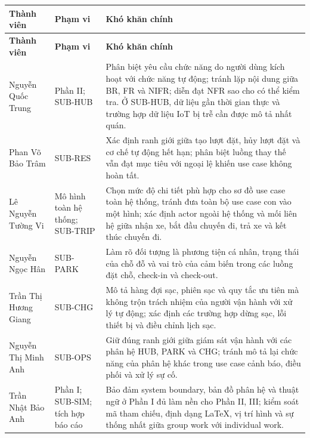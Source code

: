 \documentclass[10pt,a4paper]{article}
\begin{document}
\begingroup
\small
\renewcommand{\arraystretch}{1.12}
\begin{longtable}{|L{38mm}|L{34mm}|L{70mm}|}
  \hline
  \centering\arraybackslash\textbf{Thành viên} &
  \centering\arraybackslash\textbf{Phạm vi} &
  \centering\arraybackslash\textbf{Khó khăn chính}\\
  \hline
  \endfirsthead
  \hline
  \centering\arraybackslash\textbf{Thành viên} &
  \centering\arraybackslash\textbf{Phạm vi} &
  \centering\arraybackslash\textbf{Khó khăn chính}\\
  \hline
  \endhead
  Nguyễn Quốc Trung & Phần II; SUB-HUB &
  Phân biệt yêu cầu chức năng do người dùng kích hoạt với chức năng tự động; tránh lặp nội dung giữa BR, FR và NIFR; diễn đạt NFR sao cho có thể kiểm tra. Ở SUB-HUB, dữ liệu gần thời gian thực và trường hợp dữ liệu IoT bị trễ cần được mô tả nhất quán.\\
  \hline
  Phan Võ Bảo Trâm & SUB-RES &
  Xác định ranh giới giữa tạo lượt đặt, hủy lượt đặt và cơ chế tự động hết hạn; phân biệt luồng thay thế vẫn đạt mục tiêu với ngoại lệ khiến use case không hoàn tất.\\
  \hline
  Lê Nguyễn Tường Vi & Mô hình toàn hệ thống; SUB-TRIP &
  Chọn mức độ chi tiết phù hợp cho sơ đồ use case toàn hệ thống, tránh đưa toàn bộ use case con vào một hình; xác định actor ngoài hệ thống và mối liên hệ giữa nhận xe, bắt đầu chuyến đi, trả xe và kết thúc chuyến đi.\\
  \hline
  Nguyễn Ngọc Hân & SUB-PARK &
  Làm rõ đối tượng là phương tiện cá nhân, trạng thái của chỗ đỗ và vai trò của cảm biến trong các luồng đặt chỗ, check-in và check-out.\\
  \hline
  Trần Thị Hương Giang & SUB-CHG &
  Mô tả hàng đợi sạc, phiên sạc và quy tắc ưu tiên mà không trộn trách nhiệm của người vận hành với xử lý tự động; xác định các trường hợp dừng sạc, lỗi thiết bị và điều chỉnh lịch sạc.\\
  \hline
  Nguyễn Thị Minh Anh & SUB-OPS &
  Giữ đúng ranh giới giữa giám sát vận hành với các phân hệ HUB, PARK và CHG; tránh mô tả lại chức năng của phân hệ khác trong use case cảnh báo, điều phối và xử lý sự cố.\\
  \hline
  Trần Nhật Bảo Anh & Phần I; SUB-SIM; tích hợp báo cáo &
  Bảo đảm system boundary, bản đồ phân hệ và thuật ngữ ở Phần I đủ làm nền cho Phần II, III; kiểm soát mã tham chiếu, định dạng LaTeX, vị trí hình và sự thống nhất giữa group work với individual work.\\
  \hline
\end{longtable}
\endgroup
\end{document}
